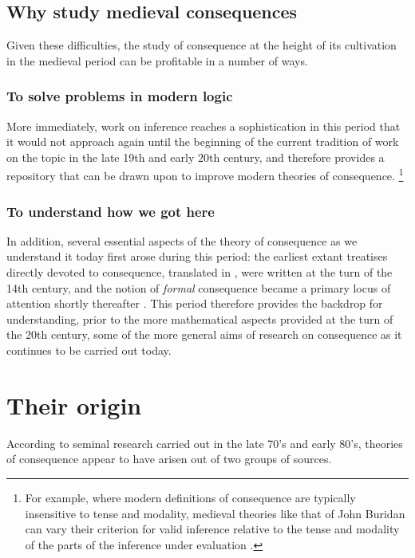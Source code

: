 \documentclass[]{article}
\begin{document}
\subsection{Why study medieval consequences}
Given these difficulties, 
the study of consequence at the height of its cultivation in the medieval period can be profitable in a number of ways. 

\subsubsection{To solve problems in modern logic}
More immediately, 
work on inference reaches a sophistication in this period that it would not approach again until the beginning of the current tradition of work on the topic in the late 19th and early 20th century, 
and therefore provides a repository that can be drawn upon to improve modern theories of consequence.
\footnote{For example, 
where modern definitions of consequence are typically insensitive to tense and modality, 
medieval theories like that of John Buridan can vary their criterion for valid inference relative to the tense and modality of the parts of the inference under evaluation \autocite[63]{Read2015}.}

\subsubsection{To understand how we got here}
In addition, 
several essential aspects of the theory of consequence as we understand it today first arose during this period: 
the earliest extant treatises directly devoted to consequence, 
translated in \autocite{Archambault2017d}, 
were written at the turn of the 14th century, 
and the notion of \emph{formal} consequence became a primary locus of attention shortly thereafter \autocite{DutilhNovaes2012a}. 
This period therefore provides the backdrop for understanding, 
prior to the more mathematical aspects provided at the turn of the 20th century, 
some of the more general aims of research on consequence as it continues to be carried out today. 

\section{Their origin}
According to seminal research carried out in the late 70's and early 80's,
theories of consequence appear to have arisen out of two groups of sources. 
\end{document}
